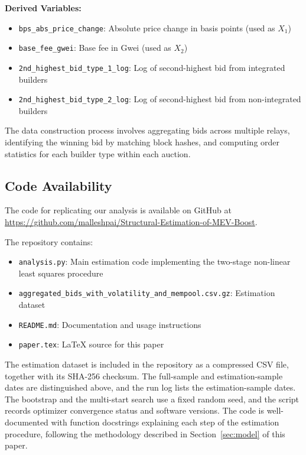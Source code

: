 \documentclass[12pt,reqno]{amsart}
\begin{document}
\textbf{Derived Variables:}
\begin{itemize}
\item \texttt{bps\_abs\_price\_change}: Absolute price change in basis points (used as $X_1$)
\item \texttt{base\_fee\_gwei}: Base fee in Gwei (used as $X_2$)
\item \texttt{2nd\_highest\_bid\_type\_1\_log}: Log of second-highest bid from integrated builders
\item \texttt{2nd\_highest\_bid\_type\_2\_log}: Log of second-highest bid from non-integrated builders
\end{itemize}

The data construction process involves aggregating bids across multiple relays, identifying the winning bid by matching block hashes, and computing order statistics for each builder type within each auction.

\subsection{Code Availability}

The code for replicating our analysis is available on GitHub at \url{https://github.com/malleshpai/Structural-Estimation-of-MEV-Boost}.

The repository contains:
\begin{itemize}
\item \texttt{analysis.py}: Main estimation code implementing the two-stage non-linear least squares procedure
\item \texttt{aggregated\_bids\_with\_volatility\_and\_mempool.csv.gz}: Estimation dataset
\item \texttt{README.md}: Documentation and usage instructions
\item \texttt{paper.tex}: LaTeX source for this paper
\end{itemize}

The estimation dataset is included in the repository as a compressed CSV file, together with its SHA-256 checksum. The full-sample and estimation-sample dates are distinguished above, and the run log lists the estimation-sample dates. The bootstrap and the multi-start search use a fixed random seed, and the script records optimizer convergence status and software versions. The code is well-documented with function docstrings explaining each step of the estimation procedure, following the methodology described in Section~\ref{sec:model} of this paper.
\end{document}
